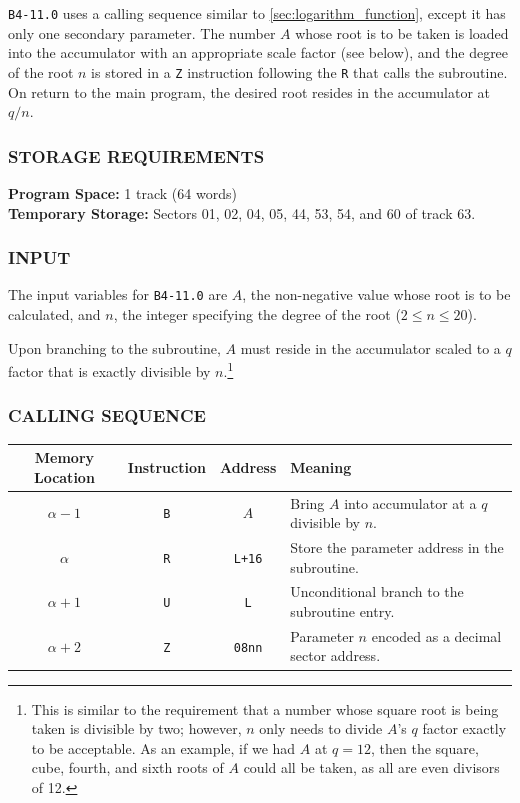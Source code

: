 \noindent
\texttt{B4-11.0} uses a calling sequence similar to \ref{sec:logarithm_function}, except it has only one secondary parameter. The number $A$ whose root is to be taken is loaded into the accumulator with an appropriate scale factor (see below), and the degree of the root $n$ is stored in a \texttt{Z} instruction following the \texttt{R} that calls the subroutine. On return to the main program, the desired root resides in the accumulator at $q/n$.

\subsubsection*{STORAGE REQUIREMENTS}
\textbf{Program Space:} 1 track (64 words) \\
\textbf{Temporary Storage:} Sectors 01, 02, 04, 05, 44, 53, 54, and 60 of track 63.

\subsubsection*{INPUT}
The input variables for \texttt{B4-11.0} are $A$, the non-negative value whose root is to be calculated, and $n$, the integer specifying the degree of the root ($2 \le n \le 20$). 

Upon branching to the subroutine, $A$ must reside in the accumulator scaled to a $q$ factor that is exactly divisible by $n$.\footnote{This is similar to the requirement that a number whose square root is being taken is divisible by two; however, $n$ only needs to divide $A$'s $q$ factor exactly to be acceptable. As an example, if we had $A$ at $q=12$, then the square, cube, fourth, and sixth roots of $A$ could all be taken, as all are even divisors of 12.}

\subsubsection*{CALLING SEQUENCE}
\begin{table}[h!]
\centering
\begin{tabularx}{\textwidth}{cccX}
\toprule
\textbf{Memory Location} & \textbf{Instruction} & \textbf{Address} & \textbf{Meaning} \\
\midrule
$\alpha - 1$ & \texttt{B} & $A$ & Bring $A$ into accumulator at a $q$ divisible by $n$. \\
$\alpha$ & \texttt{R} & \texttt{L+16} & Store the parameter address in the subroutine. \\
$\alpha + 1$ & \texttt{U} & \texttt{L} & Unconditional branch to the subroutine entry. \\
$\alpha + 2$ & \texttt{Z} & \texttt{08nn} & Parameter $n$ encoded as a decimal sector address. \\
\bottomrule
\end{tabularx}
\end{table}

